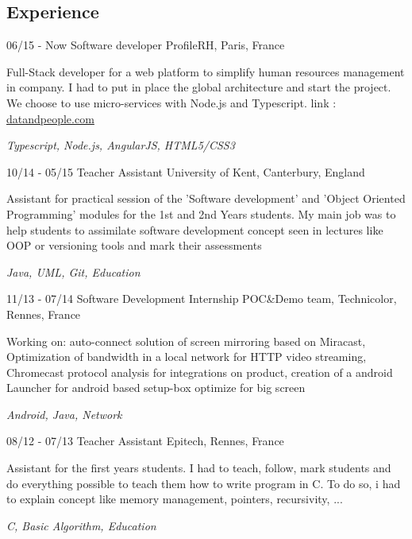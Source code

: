 \documentclass[8pt]{friggeri-cv}
\begin{document}
\begin{samepage}
\section{Experience}
\begin{entrylist}
\entry
    {06/15 - Now}
    {Software developer}
    {ProfileRH, Paris, France}
    {Full-Stack developer for a web platform to simplify human resources management in company. I had to put in place the global architecture and start the project. We choose to use micro-services with Node.js and Typescript. link : \href{http://datandpeople.com/}{datandpeople.com}
    \begin{FlushRight}\textit{Typescript, Node.js, AngularJS, HTML5/CSS3}\end{FlushRight}}
  \entry
    {10/14 - 05/15}
    {Teacher Assistant}
    {University of Kent, Canterbury, England}
    {Assistant for practical session of the 'Software development' and 'Object Oriented Programming' modules for the 1st and 2nd Years students. My main job was to help students to assimilate software development concept seen in lectures like OOP or versioning tools and mark their assessments
    \begin{FlushRight}\textit{Java, UML, Git, Education}\end{FlushRight}}
  \entry
    {11/13 - 07/14}
    {Software Development Internship}
    {POC\&Demo team, Technicolor, Rennes, France}
    {Working on: auto-connect solution of screen mirroring based on Miracast, Optimization of bandwidth in a local network for HTTP video streaming, Chromecast protocol analysis for integrations on product, creation of a android Launcher for android based setup-box optimize for big screen \begin{FlushRight}\textit{Android, Java, Network}\end{FlushRight}}
  \entry
    {08/12 - 07/13}
    {Teacher Assistant}
    {Epitech, Rennes, France}
    {Assistant for the first years students. I had to teach, follow, mark students and do everything possible to teach them how to write program in C. To do so, i had to explain concept like memory management, pointers, recursivity, ... 
    \begin{FlushRight}\textit{C, Basic Algorithm, Education}\end{FlushRight}}
\end{entrylist}


\end{samepage}
\end{document}
